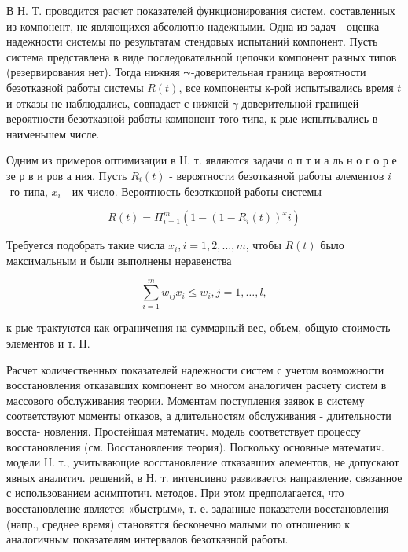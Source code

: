 \documentclass[10pt]{article}
\begin{document}
В Н. Т. проводится расчет показателей функционирования систем, составленных из компонент, не являющихся абсолютно надежными. Одна из задач - оценка надежности системы по результатам стендовых испытаний компонент. Пусть система представлена в виде последовательной цепочки компонент разных типов (резервирования нет). Тогда нижняя $\boldsymbol{\gamma}$-доверительная граница вероятности безотказной работы системы $R(t)$, все компоненты к-рой испытывались время $t$ и отказы не наблюдались, совпадает с нижней $\gamma$-доверительной границей вероятности безотказной работы компонент того типа, к-рые испытывались в наименьшем числе.



Одним из примеров оптимизации в Н. т. являются задачи о п т и а ль н о г о р е зе р в и ров а ния. Пусть $R_{i}(t)$ - вероятности безотказной работы әлементов $i$-го типа, $x_{i}$ - их число. Вероятность безотказной работы системы



\[

R(t)=\Pi_{i=1}^{m}\left(1-\left(1-R_{i}(t)\right)^{x} i\right)

\]



Требуется подобрать такие числа $x_{i}, i=1,2, \ldots, m$, чтобы $R(t)$ было максимальным и были выполнены неравенства



\[

\sum_{i=1}^{m} w_{i j} x_{i} \leqslant w_{i}, j=1, \ldots, l,

\]



к-рые трактуются как ограничения на суммарный вес, объем, общую стоимость элементов и т. П.



Расчет количественных показателей надежности систем с учетом возможности восстановления отказавших компонент во многом аналогичен расчету систем в массового обслуживания теории. Моментам поступления заявок в систему соответствуют моменты отказов, а длительностям обслуживания - длительности восста- новления. Простейшая математич. модель соответствует процессу восстановления (см. Восстановления теория). Поскольку основные математич. модели Н. т., учитывающие восстановление отказавших әлементов, не допускают явных аналитич. решений, в Н. т. интенсивно развивается направление, связанное с использованием асимптотич. методов. При этом предполагается, что восстановление является «быстрым», т. е. заданные показатели восстановления (напр., среднее время) становятся бесконечно малыми по отношению к аналогичным показателям интервалов безотказной работы.
\end{document}
